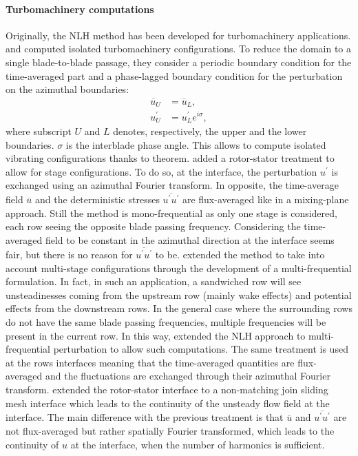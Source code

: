 \paragraph{Turbomachinery computations}
Originally, the NLH method has been developed for 
turbomachinery applications. \citet{He1998} and
\citet{Ning1998} computed isolated turbomachinery
configurations. To reduce the domain to a single 
blade-to-blade passage, they consider a periodic
boundary condition for the time-averaged part and a
phase-lagged boundary condition for the perturbation on the
azimuthal boundaries:
\begin{equation}
    \begin{split}
    	\overline{u}_U &= \overline{u}_L, \\
    	u^\prime_U &= u^\prime_L e^{i \sigma},
    \end{split}
\end{equation}
where subscript $U$ and $L$ denotes, respectively, 
the upper and the lower boundaries. $\sigma$ is the
interblade phase angle. This allows to compute
isolated vibrating configurations thanks to 
\citet{Lane1956} theorem.
\citet{Chen2001} added a rotor-stator treatment
to allow for stage configurations. 
To do so, at the interface, the perturbation 
$u^\prime$ is exchanged using
an azimuthal Fourier transform. In opposite,
the time-average field $\overline{u}$ 
and the deterministic stresses 
$\overline{u^\prime u^\prime}$
are flux-averaged like in a mixing-plane approach.
Still the method is mono-frequential as only
one stage is considered, each row seeing the
opposite blade passing frequency. Considering
the time-averaged field to be constant in the azimuthal 
direction at the interface seems fair, but there is
no reason for $\overline{u^\prime u^\prime}$ to be.
\citet{He2002} extended the method to take into
account multi-stage configurations through the
development of a multi-frequential formulation.
In fact, in such an application, 
a sandwiched row will see unsteadinesses coming
from the upstream row (mainly wake effects) and
potential effects from the downstream rows. In the
general case where the surrounding rows do not have the
same blade passing frequencies, multiple frequencies
will be present in the current row. 
In this way, \citet{He2002} extended the NLH approach to
multi-frequential perturbation to allow such computations.
The same treatment is used at the rows interfaces meaning
that the time-averaged quantities are flux-averaged and the
fluctuations are exchanged through their azimuthal
Fourier transform.
\citet{Vilmin2006} extended the rotor-stator
interface to a non-matching join sliding mesh interface which
leads to the continuity of the unsteady flow field at the interface.
The main difference with the previous treatment is that
$\overline{u}$ and $\overline{u^\prime u^\prime}$ 
are not flux-averaged but rather spatially Fourier transformed,
which leads to the continuity of $u$ at the interface, when
the number of harmonics is sufficient.

